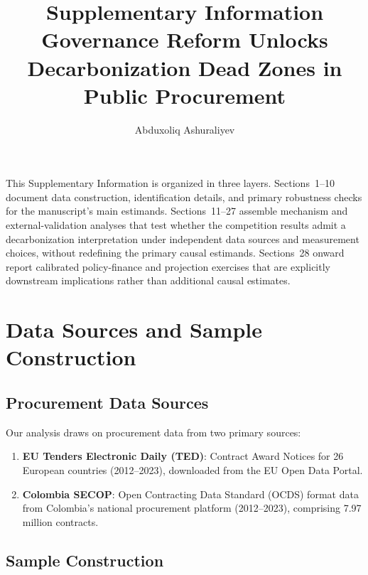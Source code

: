\documentclass[11pt]{article}
\title{\textbf{Supplementary Information}\\[0.5em]
\large Governance Reform Unlocks Decarbonization Dead Zones in Public Procurement}
\author{Abduxoliq Ashuraliyev}
\date{}
\begin{document}
\maketitle

\tableofcontents
\newpage

This Supplementary Information is organized in three layers. Sections~1--10 document data construction, identification details, and primary robustness checks for the manuscript's main estimands. Sections~11--27 assemble mechanism and external-validation analyses that test whether the competition results admit a decarbonization interpretation under independent data sources and measurement choices, without redefining the primary causal estimands. Sections~28 onward report calibrated policy-finance and projection exercises that are explicitly downstream implications rather than additional causal estimates.

\section{Data Sources and Sample Construction}

\subsection{Procurement Data Sources}

Our analysis draws on procurement data from two primary sources:

\begin{enumerate}
\item \textbf{EU Tenders Electronic Daily (TED)}: Contract Award Notices for 26 European countries (2012--2023), downloaded from the EU Open Data Portal.

\item \textbf{Colombia SECOP}: Open Contracting Data Standard (OCDS) format data from Colombia's national procurement platform (2012--2023), comprising 7.97 million contracts.
\end{enumerate}

\subsection{Sample Construction}
\end{document}
